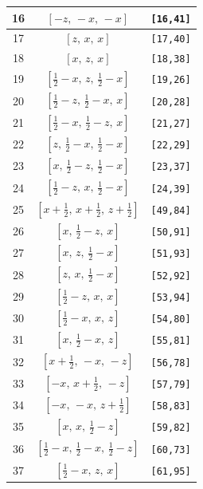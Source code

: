 \documentclass[fleqn,8pt]{jsarticle}
\begin{document}
\begin{longtable}{ccc}
16 & $\left[ - z,\, - x,\, - x \right]$ & {\tt [16,41]} \\ \hline
17 & $\left[ z,\, x,\, x \right]$ & {\tt [17,40]} \\ \hline
18 & $\left[ x,\, z,\, x \right]$ & {\tt [18,38]} \\ \hline
19 & $\left[ \frac{1}{2} - x,\, z,\, \frac{1}{2} - x \right]$ & {\tt [19,26]} \\ \hline
20 & $\left[ \frac{1}{2} - z,\, \frac{1}{2} - x,\, x \right]$ & {\tt [20,28]} \\ \hline
21 & $\left[ \frac{1}{2} - x,\, \frac{1}{2} - z,\, x \right]$ & {\tt [21,27]} \\ \hline
22 & $\left[ z,\, \frac{1}{2} - x,\, \frac{1}{2} - x \right]$ & {\tt [22,29]} \\ \hline
23 & $\left[ x,\, \frac{1}{2} - z,\, \frac{1}{2} - x \right]$ & {\tt [23,37]} \\ \hline
24 & $\left[ \frac{1}{2} - z,\, x,\, \frac{1}{2} - x \right]$ & {\tt [24,39]} \\ \hline
25 & $\left[ x + \frac{1}{2},\, x + \frac{1}{2},\, z + \frac{1}{2} \right]$ & {\tt [49,84]} \\ \hline
26 & $\left[ x,\, \frac{1}{2} - z,\, x \right]$ & {\tt [50,91]} \\ \hline
27 & $\left[ x,\, z,\, \frac{1}{2} - x \right]$ & {\tt [51,93]} \\ \hline
28 & $\left[ z,\, x,\, \frac{1}{2} - x \right]$ & {\tt [52,92]} \\ \hline
29 & $\left[ \frac{1}{2} - z,\, x,\, x \right]$ & {\tt [53,94]} \\ \hline
30 & $\left[ \frac{1}{2} - x,\, x,\, z \right]$ & {\tt [54,80]} \\ \hline
31 & $\left[ x,\, \frac{1}{2} - x,\, z \right]$ & {\tt [55,81]} \\ \hline
32 & $\left[ x + \frac{1}{2},\, - x,\, - z \right]$ & {\tt [56,78]} \\ \hline
33 & $\left[ - x,\, x + \frac{1}{2},\, - z \right]$ & {\tt [57,79]} \\ \hline
34 & $\left[ - x,\, - x,\, z + \frac{1}{2} \right]$ & {\tt [58,83]} \\ \hline
35 & $\left[ x,\, x,\, \frac{1}{2} - z \right]$ & {\tt [59,82]} \\ \hline
36 & $\left[ \frac{1}{2} - x,\, \frac{1}{2} - x,\, \frac{1}{2} - z \right]$ & {\tt [60,73]} \\ \hline
37 & $\left[ \frac{1}{2} - x,\, z,\, x \right]$ & {\tt [61,95]} \\ \hline

\end{longtable}
\end{document}
